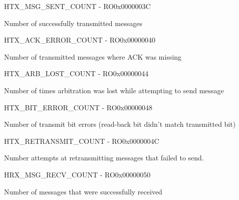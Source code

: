 \documentclass{article}
\begin{document}
\begin{register}{H}{TX{\_}MSG{\_}SENT{\_}COUNT - RO}{0x0000003C}  \par Number of successfully transmitted messages \regnewline
  \label{TX_MSG_SENT_COUNT}
\regnewline
\end{register}

\begin{register}{H}{TX{\_}ACK{\_}ERROR{\_}COUNT - RO}{0x00000040}  \par Number of transmitted messages where ACK was missing \regnewline
  \label{TX_ACK_ERROR_COUNT}
\regnewline
\end{register}

\begin{register}{H}{TX{\_}ARB{\_}LOST{\_}COUNT - RO}{0x00000044}  \par Number of times arbitration was lost while attempting to send message \regnewline
  \label{TX_ARB_LOST_COUNT}
\regnewline
\end{register}

\begin{register}{H}{TX{\_}BIT{\_}ERROR{\_}COUNT - RO}{0x00000048}  \par Number of transmit bit errors (read-back bit didn't match transmitted bit) \regnewline
  \label{TX_BIT_ERROR_COUNT}
\regnewline
\end{register}

\begin{register}{H}{TX{\_}RETRANSMIT{\_}COUNT - RO}{0x0000004C}  \par Number attempts at retransmitting messages that failed to send. \regnewline
  \label{TX_RETRANSMIT_COUNT}
\regnewline
\end{register}

\begin{register}{H}{RX{\_}MSG{\_}RECV{\_}COUNT - RO}{0x00000050}  \par Number of messages that were successfully received \regnewline
  \label{RX_MSG_RECV_COUNT}
\regnewline
\end{register}
\end{document}
